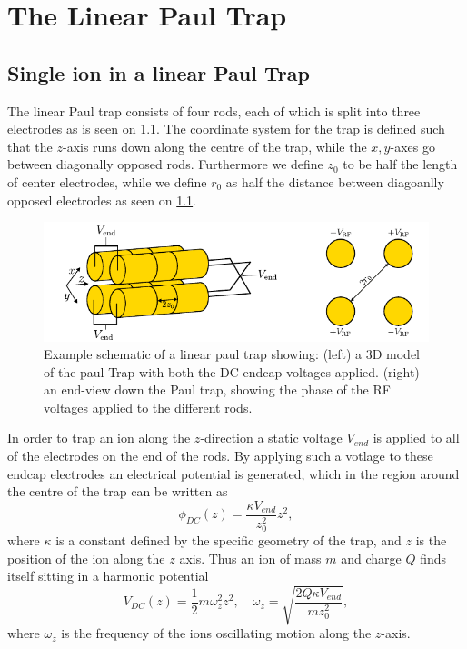 \chapter{The Linear Paul Trap}
\label{chap:LinTrap}

\section{Single ion in a linear Paul Trap}
\label{sec:1Ion}
The linear Paul trap consists of four rods, each of which is split into three electrodes as is seen on \cref{fig:PaulTrap}. The coordinate system for the trap is defined such that the $z$-axis runs down along the centre of the trap,
while the $x,y$-axes go between diagonally opposed rods. Furthermore we define $z_0$ to be half the length of center electrodes, while we define $r_0$ as half the distance between diagoanlly opposed electrodes as seen on \cref{fig:PaulTrap}.
\begin{figure}
    \centering
    \includegraphics{main/Paul_Trap.pdf}
    \caption{Example schematic of a linear paul trap showing: (left) a 3D model of the paul Trap with both the DC endcap voltages applied.
    (right) an end-view down the Paul trap, showing the phase of the RF voltages applied to the different rods.}
    \label{fig:PaulTrap}
\end{figure}
In order to trap an ion along the $z$-direction a static voltage $V_{end}$ is applied to all of the electrodes on the end of the rods. By applying such a votlage to these endcap electrodes an electrical potential is generated, which in the region around the centre of the trap can be written as
\begin{equation}
    \phi_{DC}(z) = \frac{\kappa V_{end}}{z_0^2}z^2,
    \label{eq:phi_DC_z} 
\end{equation}
where $\kappa$ is a constant defined by the specific geometry of the trap, and $z$ is the position of the ion along the $z$ axis.
Thus an ion of mass $m$ and charge $Q$ finds itself sitting in a harmonic potential
\begin{equation}
    \label{eq:omega_z}
    V_{DC}(z) = \frac{1}{2}m\omega_z^2 z^2, \quad\omega_z = \sqrt{\frac{2Q\kappa V_{end}}{mz_0^2}},
\end{equation}
where $\omega_z$ is the frequency of the ions oscillating motion along the $z$-axis.

